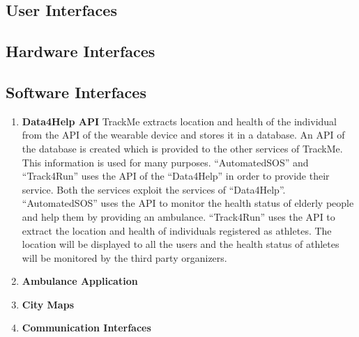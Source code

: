\subsection{User Interfaces}


\subsection{Hardware Interfaces}


\subsection{Software Interfaces}
\begin{enumerate}
\item \textbf{Data4Help API}
\newline \qquad TrackMe extracts location and health of the individual from the API of the   wearable device and stores it in a database. An API of the database is created which is provided to the other services of TrackMe. This information is used for many purposes. “AutomatedSOS” and “Track4Run” uses the API of the “Data4Help” in order to provide their service. Both the services exploit the services of “Data4Help”. “AutomatedSOS” uses the API to monitor the health status of elderly people and help them by providing an ambulance. “Track4Run” uses the API to extract the location and health of individuals registered as athletes. The location will be displayed to all the users and the health status of athletes will be monitored by the third party organizers.
\item \textbf{Ambulance Application}
\item \textbf{City Maps}
\item \textbf{Communication Interfaces}
\end{enumerate}